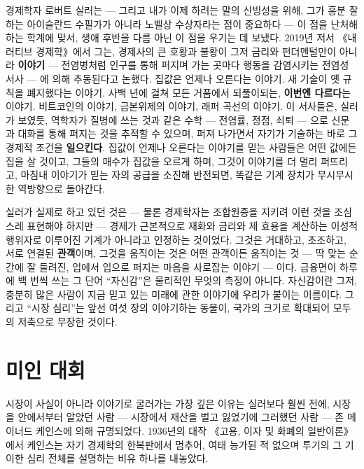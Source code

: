 경제학자 로버트 실러는 — 그리고 내가 이제 하려는 말의 신빙성을 위해, 그가 흥분 잘하는 아이슬란드 수필가가 아니라 노벨상 수상자라는 점이 중요하다 — 이 점을 난처해하는 학계에 맞서, 생애 후반을 다름 아닌 이 점을 우기는 데 보냈다. 2019년 저서 《내러티브 경제학》에서 그는, 경제사의 큰 호황과 불황이 그저 금리와 펀더멘털만이 아니라 \textbf{이야기} — 전염병처럼 인구를 통해 퍼지며 가는 곳마다 행동을 감염시키는 전염성 서사 — 에 의해 추동된다고 논했다. 집값은 언제나 오른다는 이야기. 새 기술이 옛 규칙을 폐지했다는 이야기. 사백 년에 걸쳐 모든 거품에서 되풀이되는, \textbf{이번엔 다르다}는 이야기. 비트코인의 이야기, 금본위제의 이야기, 래퍼 곡선의 이야기. 이 서사들은, 실러가 보였듯, 역학자가 질병에 쓰는 것과 같은 수학 — 전염률, 정점, 쇠퇴 — 으로 신문과 대화를 통해 퍼지는 것을 추적할 수 있으며, 퍼져 나가면서 자기가 기술하는 바로 그 경제적 조건을 \textbf{일으킨다}. 집값이 언제나 오른다는 이야기를 믿는 사람들은 어떤 값에든 집을 살 것이고, 그들의 매수가 집값을 오르게 하며, 그것이 이야기를 더 멀리 퍼뜨리고, 마침내 이야기가 믿는 자의 공급을 소진해 반전되면, 똑같은 기계 장치가 무시무시한 역방향으로 돌아간다.

실러가 실제로 하고 있던 것은 — 물론 경제학자는 조합원증을 지키려 이런 것을 조심스레 표현해야 하지만 — 경제가 근본적으로 재화와 금리와 제 효용을 계산하는 이성적 행위자로 이루어진 기계가 아니라고 인정하는 것이었다. 그것은 거대하고, 초조하고, 서로 연결된 \textbf{관객}이며, 그것을 움직이는 것은 어떤 관객이든 움직이는 것 — 딱 맞는 순간에 잘 들려진, 입에서 입으로 퍼지는 마음을 사로잡는 이야기 — 이다. 금융면이 하루에 백 번씩 쓰는 그 단어 ``자신감''은 물리적인 무엇의 측정이 아니다. 자신감이란 그저, 충분히 많은 사람이 지금 믿고 있는 미래에 관한 이야기에 우리가 붙이는 이름이다. 그리고 ``시장 심리''는 앞선 여섯 장의 이야기하는 동물이, 국가의 크기로 확대되어 모두의 저축으로 무장한 것이다.

\section*{미인 대회}

시장이 사실이 아니라 이야기로 굴러가는 가장 깊은 이유는 실러보다 훨씬 전에, 시장을 안에서부터 알았던 사람 — 시장에서 재산을 벌고 잃었기에 그러했던 사람 — 존 메이너드 케인스에 의해 규명되었다. 1936년의 대작 《고용, 이자 및 화폐의 일반이론》에서 케인스는 자기 경제학의 한복판에서 멈추어, 여태 능가된 적 없으며 투기의 그 기이한 심리 전체를 설명하는 비유 하나를 내놓았다.

